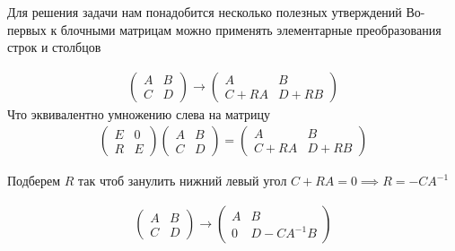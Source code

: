 \begin{sol}
    Для решения задачи нам понадобится несколько полезных утверждений
    Во-первых к блочными матрицам можно применять элементарные преобразования
    строк и столбцов
    
    \begin{gather*}
        \left(
        \begin{array}{cc}
           A &  B \\
           C &  D
        \end{array}\right) \rightarrow \left(
        \begin{array}{cc}
           A &  B \\
           C + RA &  D +RB
        \end{array}\right)
    \end{gather*}
    Что эквивалентно умножению слева на матрицу
    \begin{gather*}
        \left(
        \begin{array}{cc}
               E &  0 \\
               R &  E
        \end{array}\right)
        \left(
        \begin{array}{cc}
           A &  B \\
           C &  D 
        \end{array}\right)
        =\left(
        \begin{array}{cc}
           A &  B \\
           C + RA &  D +RB
        \end{array}\right)
    \end{gather*}
    
    Подберем $R$ так чтоб занулить нижний левый угол
    $C +  RA = 0 \implies R = -C A^{-1}$
    
    \begin{gather*}
        \left(
        \begin{array}{cc}
           A &  B \\
           C &  D 
        \end{array}\right) \rightarrow 
         \left(
        \begin{array}{cc}
           A &  B \\
           0 &  D - C A^{-1}B
        \end{array}\right)
    \end{gather*}
    

\end{sol}
